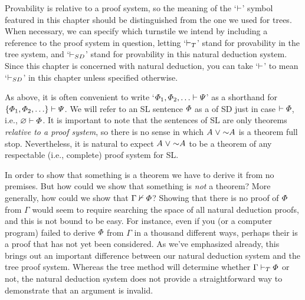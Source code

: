 Provability is relative to a proof system, so the meaning of the `$\vdash$' symbol featured in this chapter should be distinguished from the one we used for trees.
When necessary, we can specify which turnstile we intend by including a reference to the proof system in question, letting `$\vdash_{T}$' stand for provability in the tree system, and `$\vdash_{SD}$' stand for provability in this natural deduction system.
Since this chapter is concerned with natural deduction, you can take `$\vdash$' to mean `$\vdash_{SD}$' in this chapter unless specified otherwise.

As above, it is often convenient to write `$\varPhi_1,\varPhi_2,\ldots\vdash\varPsi$' as a shorthand for $\lbrace\varPhi_1,\varPhi_2,\ldots\rbrace\vdash\varPsi$.
We will refer to an SL sentence $\varPhi$ as a  of SD just in case $\vdash\varPhi$, i.e., $\varnothing\vdash\varPhi$.
It is important to note that the sentences of SL are only theorems \textit{relative to a proof system}, so there is no sense in which $A\eor\enot A$ is a theorem full stop.
Nevertheless, it is natural to expect $A\eor\enot A$ to be a theorem of any respectable (i.e., complete) proof system for SL.

In order to show that something is a theorem we have to derive it from no premises.
But how could we show that something is \emph{not} a theorem?
More generally, how could we show that $\Gamma \nvdash \varPhi$?
Showing that there is no proof of $\varPhi$ from $\Gamma$ would seem to require searching the space of all natural deduction proofs, and this is not bound to be easy. 
For instance, even if you (or a computer program) failed to derive $\varPhi$ from $\Gamma$ in a thousand different ways, perhaps their is a proof that has not yet been considered.
As we've emphasized already, this brings out an important difference between our natural deduction system and the tree proof system.
Whereas the tree method will determine whether $\Gamma \vdash_{T} \varPhi$ or not, the natural deduction system does not provide a straightforward way to demonstrate that an argument is invalid.






